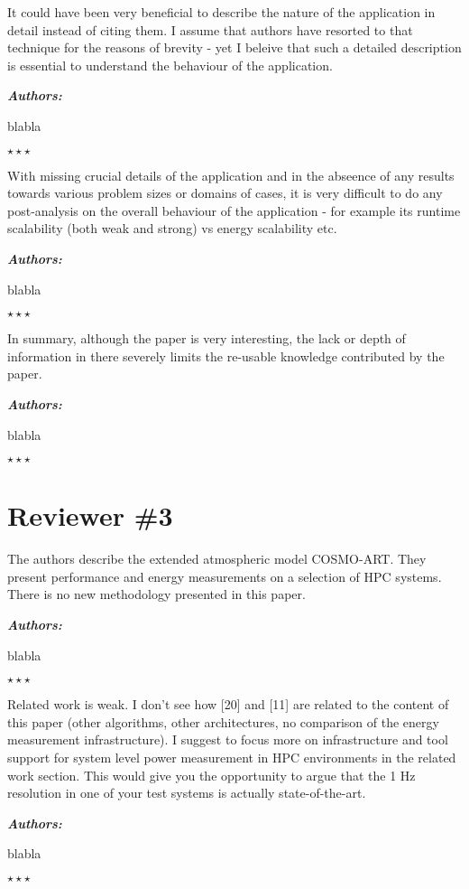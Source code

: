 \documentclass[a4paper,11pt]{article}
\newcounter{question}
\newcommand{\weReply}{\vspace{0.25cm} {\bf \noindent } \addtocounter{question}{1} \textbf{\emph{Authors:}} \medskip \em\par}
\newenvironment{weSay}{\bigskip \weReply \begin{it}}{\end{it}\begin{center} \samepage$\star \star \star$ \end{center}}
\begin{document}
It could have been very beneficial to describe the nature of the application in detail instead of 
citing them. I assume that authors have resorted to that technique for the reasons of brevity  - yet 
I beleive that such a detailed description is essential to understand the behaviour of the application.

\begin{weSay}
blabla
\end{weSay}

With missing crucial details of the application and in the abseence of any results towards various 
problem sizes or domains of cases, it is very difficult to do any post-analysis on the overall 
behaviour of the application - for example its runtime scalability (both weak and strong) vs energy 
scalability etc.

\begin{weSay}
blabla
\end{weSay}

In summary, although the paper is very interesting, the lack or depth of information in there severely 
limits the re-usable knowledge contributed by the paper.

\begin{weSay}
blabla
\end{weSay}


\newpage
\section*{Reviewer \#3}

The authors describe the extended atmospheric model COSMO-ART. They present
performance and energy measurements on a selection of HPC systems. There
is no new methodology presented in this paper.

\begin{weSay}
blabla
\end{weSay}

Related work is weak. I don't see how [20] and [11] are related to the content
of this paper (other algorithms, other architectures, no comparison of the
energy measurement infrastructure). I suggest to focus more on infrastructure
and tool support for system level power measurement in HPC environments in
the related work section. This would give you the opportunity to argue that
the 1 Hz resolution in one of your test systems is actually state-of-the-art.

\begin{weSay}
blabla
\end{weSay}
\end{document}
